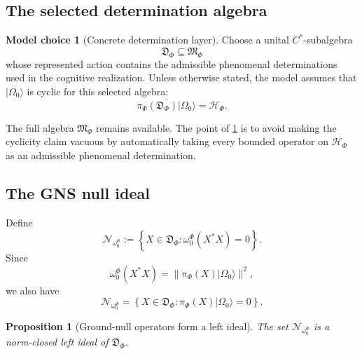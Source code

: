 \documentclass[11pt,reqno]{scrartcl}
\newcommand{\scrHF}{\mathscr H_{\Phi}}
\newcommand{\algF}{\mathfrak M_{\Phi}}
\newcommand{\piF}{\pi_{\Phi}}
\newcommand{\omegaF}{\omega_{0}^{\Phi}}
\newcommand{\ket}[1]{\lvert #1\rangle}
\newcommand{\detAlg}{\mathfrak D_{\Phi}}
\newcommand{\nullIdeal}{\mathcal N_{\omega_{0}^{\Phi}}}
\theoremstyle{plain}
\newtheorem{proposition}[proposition]{Proposition}
\theoremstyle{definition}
\newtheorem{modelchoice}[modelchoice]{Model choice}
\theoremstyle{remark}
\begin{document}
\subsection{The selected determination algebra}

\begin{modelchoice}[Concrete determination layer]
\label{choice:determination-algebra}
Choose a unital $C^*$-subalgebra
\begin{equation}
  \detAlg\subseteq\algF
  \label{eq:determination-algebra-subalgebra}
\end{equation}
whose represented action contains the admissible phenomenal determinations
used in the cognitive realization.  Unless otherwise stated, the model assumes
that $\ket{\Omega_0}$ is cyclic for this selected algebra:
\begin{equation}
  \overline{\piF(\detAlg)\ket{\Omega_0}}=\scrHF.
  \label{eq:determination-algebra-cyclicity}
\end{equation}
\end{modelchoice}

The full algebra $\algF$ remains available.  The point of
\cref{choice:determination-algebra} is to avoid making the cyclicity claim
vacuous by automatically taking every bounded operator on $\scrHF$ as an
admissible phenomenal determination.

\subsection{The GNS null ideal}

Define
\begin{equation}
  \boxed{
  \nullIdeal
  :=\left\{
      X\in\detAlg:
      \omegaF(X^*X)=0
    \right\}.}
  \label{eq:phenomenal-null-ideal}
\end{equation}
Since
\begin{equation}
  \omegaF(X^*X)
  =\|\piF(X)\ket{\Omega_0}\|^2,
  \label{eq:null-ideal-vector-norm}
\end{equation}
we also have
\begin{equation}
  \nullIdeal
  =\left\{
      X\in\detAlg:
      \piF(X)\ket{\Omega_0}=0
    \right\}.
  \label{eq:null-ideal-vector-kernel}
\end{equation}

\begin{proposition}[Ground-null operators form a left ideal]
\label{prop:null-left-ideal}
The set $\nullIdeal$ is a norm-closed left ideal of $\detAlg$.
\end{proposition}
\end{document}
